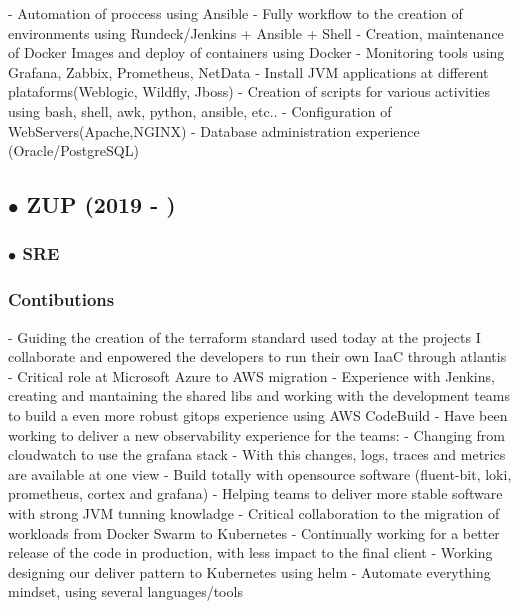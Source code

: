 \documentclass{article}
\begin{document}
- Automation of proccess using Ansible \newline
- Fully workflow to the creation of environments using Rundeck/Jenkins + Ansible + Shell \newline
- Creation, maintenance of Docker Images and deploy of containers using Docker \newline
- Monitoring tools using Grafana, Zabbix, Prometheus, NetData \newline
- Install JVM applications at different plataforms(Weblogic, Wildfly, Jboss) \newline
- Creation of scripts for various activities using bash, shell, awk, python, ansible, etc.. \newline
- Configuration of WebServers(Apache,NGINX) \newline
- Database administration experience (Oracle/PostgreSQL) \newline

\subsection{$\bullet$ ZUP (2019 - )}

\subsubsection{$\bullet$ SRE}

\subsubsection{Contibutions \\}

- Guiding the creation of the terraform standard used today at the projects I collaborate and enpowered the developers to run their own IaaC through atlantis \newline
- Critical role at Microsoft Azure to AWS migration \newline
- Experience with Jenkins, creating and mantaining the shared libs and working with the development teams to build a even more robust gitops experience using AWS CodeBuild \newline
- Have been working to deliver a new observability experience for the teams: \newline
    - Changing from cloudwatch to use the grafana stack
    - With this changes, logs, traces and metrics are available at one view
    - Build totally with opensource software (fluent-bit, loki, prometheus, cortex and grafana)
- Helping teams to deliver more stable software with strong JVM tunning knowladge \newline
- Critical collaboration to the migration of workloads from Docker Swarm to Kubernetes \newline
- Continually working for a better release of the code in production, with less impact to the final client \newline
- Working designing our deliver pattern to Kubernetes using helm  \newline
- Automate everything mindset, using several languages/tools \newline
\end{document}
